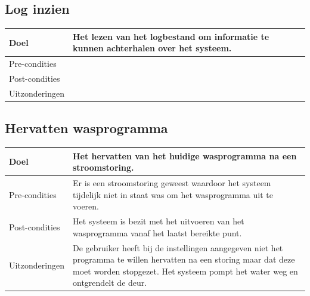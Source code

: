 	\subsection{Log inzien}
	\begin{center}
	  \begin{tabular}{ | p{4cm} | p{8.5cm} | }    \hline
		Doel & Het lezen van het logbestand om informatie te kunnen achterhalen over het systeem. \\ \hline
		Pre-condities & \\ \hline
		Post-condities & \\ \hline
		Uitzonderingen &  \\
		\hline
	  \end{tabular}
	\end{center}

	\subsection{Hervatten wasprogramma}
	\begin{center}
	  \begin{tabular}{ | p{4cm} | p{8.5cm} | }    \hline
		Doel & Het hervatten van het huidige wasprogramma na een stroomstoring. \\ \hline
		Pre-condities & Er is een stroomstoring geweest waardoor het systeem tijdelijk niet in staat was om het wasprogramma uit te voeren. \\ \hline
		Post-condities & Het systeem is bezit met het uitvoeren van het wasprogramma vanaf het laatst bereikte punt. \\ \hline
		Uitzonderingen & De gebruiker heeft bij de instellingen aangegeven niet het programma te willen hervatten na een storing maar dat deze moet worden stopgezet. Het systeem pompt het water weg en ontgrendelt de deur. \\
		\hline
	  \end{tabular}
	\end{center}